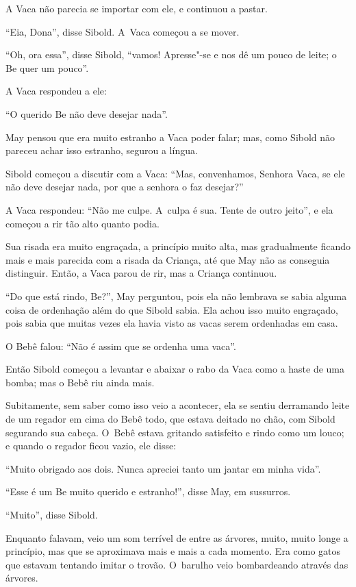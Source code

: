 A Vaca não parecia se importar com ele, e continuou a pastar.

``Eia, Dona'', disse Sibold. A~Vaca começou a se mover.

``Oh, ora essa'', disse Sibold, ``vamos! Apresse"-se e nos dê um pouco de
leite; o Be quer um pouco''.

A Vaca respondeu a ele:

``O querido Be não deve desejar nada''.

May pensou que era muito estranho a Vaca poder falar; mas, como Sibold
não pareceu achar isso estranho, segurou a língua.

Sibold começou a discutir com a Vaca: ``Mas, convenhamos, Senhora Vaca,
se ele não deve desejar nada, por que a senhora o faz desejar?''

A Vaca respondeu: ``Não me culpe. A~culpa é sua. Tente de outro jeito'',
e ela começou a rir tão alto quanto podia.

Sua risada era muito engraçada, a princípio muito alta, mas gradualmente
ficando mais e mais parecida com a risada da Criança, até que May não as
conseguia distinguir. Então, a Vaca parou de rir, mas a Criança
continuou.

``Do que está rindo, Be?'', May perguntou, pois ela não lembrava se
sabia alguma coisa de ordenhação além do que Sibold sabia. Ela achou
isso muito engraçado, pois sabia que muitas vezes ela havia visto as
vacas serem ordenhadas em casa.

O Bebê falou: ``Não é assim que se ordenha uma vaca''.

Então Sibold começou a levantar e abaixar o rabo da Vaca como a haste de
uma bomba; mas o Bebê riu ainda mais.

Subitamente, sem saber como isso veio a acontecer, ela se sentiu
derramando leite de um regador em cima do Bebê todo, que estava deitado
no chão, com Sibold segurando sua cabeça. O~Bebê estava gritando
satisfeito e rindo como um louco; e quando o regador ficou vazio, ele
disse:

``Muito obrigado aos dois. Nunca apreciei tanto um jantar em minha
vida''.

``Esse é um Be muito querido e estranho!'', disse May, em sussurros.

``Muito'', disse Sibold.

Enquanto falavam, veio um som terrível de entre as árvores, muito, muito
longe a princípio, mas que se aproximava mais e mais a cada momento. Era
como gatos que estavam tentando imitar o trovão. O~barulho veio
bombardeando através das árvores.

